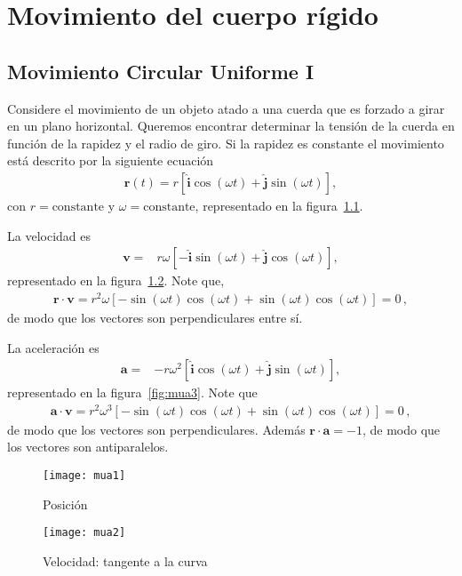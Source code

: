 \chapter{Movimiento del cuerpo rígido}

\section{Movimiento Circular Uniforme I}


Considere el movimiento de un objeto atado a una cuerda que es forzado a girar en un plano horizontal. Queremos encontrar determinar la tensión de la cuerda en función de la rapidez y el radio de giro. Si la rapidez es constante el movimiento está descrito por la siguiente ecuación
\begin{align}
  \label{eq:mua}
  \mathbf{r}(t)=r\left[\hat{\mathbf{i}}\cos(\omega t)+\hat{\mathbf{j}}\sin(\omega t)\right],
\end{align}
con $r=\text{constante}$ y $\omega=\text{constante}$, representado en la figura~\ref{fig:mua1}.

La velocidad es
\begin{align}
  \mathbf{v}=&%
  r\omega\left[-\hat{\mathbf{i}}\sin(\omega t)+\hat{\mathbf{j}}\cos(\omega t)\right],
\end{align}
representado en la figura~\ref{fig:mua2}. Note que, 
\begin{align*}
\mathbf{r}\cdot\mathbf{v}=r^2\omega 
   \left[-\sin(\omega t)\cos(\omega t)+\sin(\omega t)\cos(\omega t) \right]
  =0\,,
\end{align*}
de modo que los vectores son perpendiculares entre sí.

La aceleración es
\begin{align}
  \mathbf{a}=&%
  -r\omega^2\left[\hat{\mathbf{i}}\cos(\omega t)+\hat{\mathbf{j}}\sin(\omega t)\right],
\end{align}
representado en la figura~\ref{fig:mua3}. Note que
\begin{align*}
  \mathbf{a}\cdot\mathbf{v}=r^2\omega^3 
   \left[-\sin(\omega t)\cos(\omega t)+\sin(\omega t)\cos(\omega t) \right]
  =0\,,
\end{align*}
de modo que los vectores son perpendiculares. Además 
$\mathbf{r}\cdot\mathbf{a}=-1$, de modo que los vectores son antiparalelos.


\begin{frame}
  \begin{figure}
    \centering
    \texttt{[image: mua1]}    
    \caption{Posici\'on}
    \label{fig:mua1}
  \end{figure}

\end{frame}
\begin{frame}
  \begin{figure}
    \centering
    \texttt{[image: mua2]}    
    \caption{Velocidad: tangente a la curva}
    \label{fig:mua2}
  \end{figure}
\end{frame}

